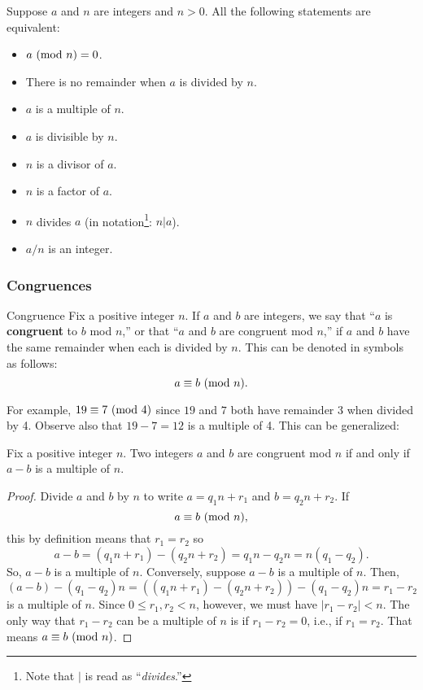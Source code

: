 \documentclass[letterpaper]{article}
\begin{document}
\begin{proposition}
    Suppose $a$ and $n$ are integers and $n > 0$. All the following statements are equivalent:
    \begin{itemize}
        \item $a \ (\mathrm{mod}\ n) = 0$.
        \item There is no remainder when $a$ is divided by $n$. 
        \item $a$ is a multiple of $n$. 
        \item $a$ is divisible by $n$. 
        \item $n$ is a divisor of $a$. 
        \item $n$ is a factor of $a$. 
        \item $n$ divides $a$ (in notation\footnote{Note that $\vert$ is read as ``\emph{divides}.''}: $n \vert a$).
        \item $a / n$ is an integer.
    \end{itemize}
\end{proposition}

\subsubsection{Congruences}
\begin{definition}{Congruence}{}
    Fix a positive integer $n$. If $a$ and $b$ are integers, we say that ``$a$ is \textbf{congruent} to $b$ mod $n$,'' or that ``$a$ and $b$ are congruent mod $n$,'' if $a$ and $b$ have the same remainder when each is divided by $n$. This can be denoted in symbols as follows: 
    \[a \equiv b \ (\mathrm{mod}\ n).\] 
\end{definition}
For example, $19 \equiv 7 \ (\mathrm{mod}\ 4)$ since $19$ and $7$ both have remainder 3 when divided by 4. Observe also that $19 - 7 = 12$ is a multiple of 4. This can be generalized: 

\begin{lemma}{}{}
    Fix a positive integer $n$. Two integers $a$ and $b$ are congruent mod $n$ if and only if $a - b$ is a multiple of $n$.
\end{lemma}

\begin{proof}
    Divide $a$ and $b$ by $n$ to write $a = q_1 n + r_1$ and $b = q_2 n + r_2$. If \[a \equiv b \ (\mathrm{mod}\ n),\] this by definition means that $r_1 = r_2$ so 
    \[a - b = (q_1 n + r_1) - (q_2 n + r_2) = q_1 n - q_2 n = n(q_1 - q_2).\]
    So, $a - b$ is a multiple of $n$. Conversely, suppose $a - b$ is a multiple of $n$. Then, 
    \[(a - b) - (q_1 - q_2)n = ((q_1 n + r_1) - (q_2 n + r_2)) - (q_1 - q_2)n = r_1 - r_2\]
    is a multiple of $n$. Since $0 \leq r_1, r_2 < n$, however, we must have $|r_1 - r_2| < n$. The only way that $r_1 - r_2$ can be a multiple of $n$ is if $r_1 - r_2 = 0$, i.e., if $r_1 = r_2$. That means $a \equiv b \ (\mathrm{mod}\ n)$. 
\end{proof}
\end{document}
